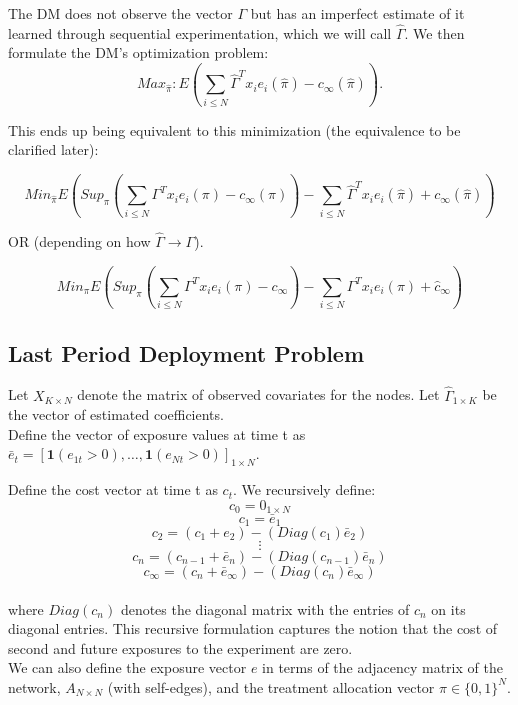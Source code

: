 \documentclass[12pt,a4paper]{article}
\begin{document}
The DM does not observe the vector $\Gamma$ but has an imperfect estimate of it learned through sequential experimentation, which we will call $\hat \Gamma$. We then formulate the DM's optimization problem:\\

$$Max_{\hat \pi} : E(\sum_{i \leq N} \hat \Gamma^T x_i e_i(\hat \pi) - c_\infty(\hat \pi) ).$$

This ends up being equivalent to this minimization (the equivalence to be clarified later):


$$ Min_{\hat \pi} E \left( Sup_\pi \left(\sum_{i \leq N} \Gamma^T x_i e_i(\pi) - c_\infty(\pi) \right) - \sum_{i \leq N} \hat \Gamma^T x_i e_i(\hat \pi) + c_\infty(\hat \pi) \right) $$

OR (depending on how $\hat \Gamma \rightarrow \Gamma$).

$$ Min_{\pi} E \left( Sup_\pi \left(\sum_{i \leq N} \Gamma^T x_i e_i(\pi) - c_\infty \right) - \sum_{i \leq N}  \Gamma^T x_i e_i(\pi) + \hat c_\infty \right) $$


\subsection{Last Period Deployment Problem}

Let $X_{K \times N}$ denote the matrix of observed covariates for the nodes. Let $\hat \Gamma _{1 \times K}$ be the vector of estimated coefficients.\\

Define the vector of exposure values at time t as $\bar e_t=[\mathbf{1}(e_{1t}>0), \dots, \mathbf{1}(e_{Nt}>0)]_{1 \times N}$. 

Define the cost vector at time t as $c_t$.  We recursively define:\\

$$c_0 = 0_{1 \times N}$$
$$c_1 = \bar e_1$$
$$c_2 = (c_1 + e_2) - (Diag(c_1)  \bar e_2)$$
$$\vdots$$
$$c_n = (c_{n-1} + \bar e_n) - (Diag(c_{n-1})  \bar e_n)$$
$$c_\infty = (c_{n} + \bar e_\infty) - (Diag(c_{n})  \bar e_\infty)$$\\

where $Diag(c_n)$ denotes the diagonal matrix with the entries of $c_n$ on its diagonal entries. This recursive formulation captures the notion that the cost of second and future exposures to the experiment are zero.\\

We can also define the exposure vector $e$ in terms of the adjacency matrix of the network, $A_{N \times N}$ (with self-edges), and the treatment allocation vector $\pi \in \{0,1\}^N$.\\
\end{document}
